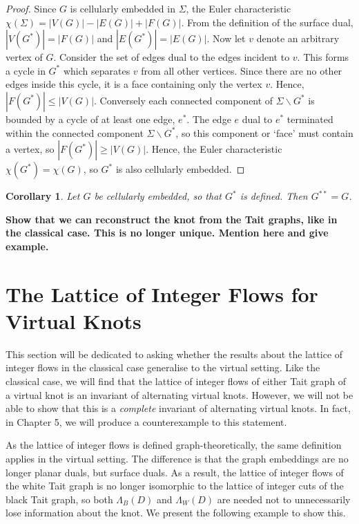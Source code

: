 \documentclass[12pt]{report}
\newcommand{\notered}[1]{{\color{Red} \textbf{#1}}}
\newtheorem*{corollary}{Corollary}
\begin{document}
\begin{proof}
Since $G$ is cellularly embedded in $\Sigma$, the Euler characteristic $\chi(\Sigma) = |V(G)| - |E(G)| + |F(G)|$. From the definition of the surface dual, $|V(G^{*})| = |F(G)|$ and $|E(G^{*})| = |E(G)|$. Now let $v$ denote an arbitrary vertex of $G$. Consider the set of edges dual to the edges incident to $v$. This forms a cycle in $G^{*}$ which separates $v$ from all other vertices. Since there are no other edges inside this cycle, it is a face containing only the vertex $v$. Hence, $|F(G^{*})| \leq |V(G)|$. Conversely each connected component of $\Sigma \smallsetminus G^{*}$ is bounded by a cycle of at least one edge, $e^{*}$. The edge $e$ dual to $e^{*}$ terminated within the connected component $\Sigma \smallsetminus G^{*}$, so this component or `face' must contain a vertex, so $|F(G^{*})| \geq |V(G)|$. Hence, the Euler characteristic $\chi(G^{*}) = \chi(G)$, so $G^{*}$ is also cellularly embedded.
\end{proof}

\begin{corollary}
Let $G$ be cellularly embedded, so that $G^{*}$ is defined. Then $G^{**} = G$.
\end{corollary}

\notered{Show that we can reconstruct the knot from the Tait graphs, like in the classical case. This is no longer unique. Mention here and give example.}

\section{The Lattice of Integer Flows for Virtual Knots}

This section will be dedicated to asking whether the results about the lattice of integer flows in the classical case generalise to the virtual setting. Like the classical case, we will find that the lattice of integer flows of either Tait graph of a virtual knot is an invariant of alternating virtual knots. However, we will not be able to show that this is a \textit{complete} invariant of alternating virtual knots. In fact, in Chapter 5, we will produce a counterexample to this statement.

As the lattice of integer flows is defined graph-theoretically, the same definition applies in the virtual setting. The difference is that the graph embeddings are no longer planar duals, but surface duals. As a result, the lattice of integer flows of the white Tait graph is no longer isomorphic to the lattice of integer cuts of the black Tait graph, so both $\Lambda_{B}(D)$ and $\Lambda_{W}(D)$ are needed not to unnecessarily lose information about the knot. We present the following example to show this.
\end{document}
